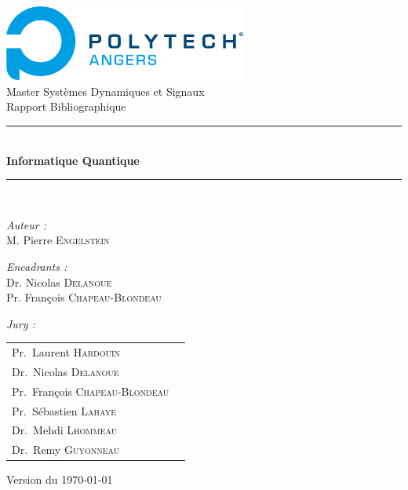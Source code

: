 \documentclass[12pt,a4paper]{report}
\begin{document}
\begin{titlepage}
    \begin{center}
    
    \includegraphics[width=0.6\textwidth]{Polytech_Angers.png}\\[1cm]
    
    {\large Master Systèmes Dynamiques et Signaux}\\[0.5cm]
    
    {\large Rapport Bibliographique}\\[0.5cm]
    
    \rule{\linewidth}{0.5mm} \\[0.4cm]
    { \huge \bfseries Informatique Quantique \\[0.4cm] }
    \rule{\linewidth}{0.5mm} \\[1.5cm]
    
    \noindent
    \begin{minipage}{0.4\textwidth}
      \begin{flushleft} \large
        \emph{Auteur :}\\
        M. Pierre \textsc{Engelstein}\\
         \end{flushleft}
         \end{minipage}%
         \begin{minipage}{0.4\textwidth}
         \begin{flushright} \large
        \emph{Encadrants :}\\
        Dr. Nicolas \textsc{Delanoue}\\
        Pr. François \textsc{Chapeau-Blondeau}\\
         \end{flushright}
    \end{minipage}
    
    \vfill
    
    \large
    \emph{Jury :}
    \begin{tabular}{lc}
        Pr.~Laurent \textsc{Hardouin}\\
        Dr.~Nicolas \textsc{Delanoue}\\
        Pr.~François \textsc{Chapeau-Blondeau}\\
        Pr.~Sébastien \textsc{Lahaye}\\
        Dr.~Mehdi  \textsc{Lhommeau}\\
        Dr.~Remy  \textsc{Guyonneau}\\
    \end{tabular}
    
    \vspace{1cm}
    {\large Version  du \today}
    
    \end{center}
\end{titlepage}
\end{document}
